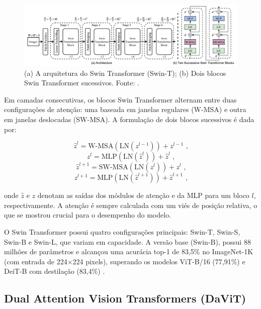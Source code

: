 \begin{figure}[!htbp]
    \centering
    \includegraphics[width=\linewidth]{figs/swin_t-arch.png}
    \caption{(a) A arquitetura do Swin Transformer (Swin-T); (b) Dois blocos Swin Transformer sucessivos. Fonte: .}
    \label{fig:swin-t-arch}
\end{figure}

Em camadas consecutivas, os blocos Swin Transformer alternam entre duas configurações de atenção: uma baseada em janelas regulares (W-MSA) e outra em janelas deslocadas (SW-MSA). A formulação de dois blocos sucessivos é dada por:

\begin{equation}
    \hat{z}^{l} = \text{W-MSA}(\text{LN}(z^{l-1}))+z^{l-1} \text{ ,}
\end{equation}
\begin{equation}
    z^{l} = \text{MLP}(\text{LN}(\hat{z}^{l}))+\hat{z}^{l} \text{ ,}
\end{equation}
\begin{equation}
    \hat{z}^{l+1} = \text{SW-MSA}(\text{LN}(z^{l}))+z^{l} \text{ ,}
\end{equation}
\begin{equation}
    z^{l+1} = \text{MLP}(\text{LN}(\hat{z}^{l+1}))+\hat{z}^{l+1} \text{ ,}
\end{equation}

onde $\hat{z}$ e $z$ denotam as saídas dos módulos de atenção e da MLP para um bloco $l$, respectivamente. A atenção é sempre calculada com um viés de posição relativa, o que se mostrou crucial para o desempenho do modelo.

O Swin Transformer possui quatro configurações principais: Swin-T, Swin-S, Swin-B e Swin-L, que variam em capacidade. A versão base (Swin-B), possui 88 milhões de parâmetros e alcançou uma acurácia top-1 de 83,5\% no ImageNet-1K (com entrada de 224×224 pixels), superando os modelos ViT-B/16 (77,91\%) e DeiT-B com destilação (83,4\%) \cite{Dosovitskiy2021, Touvron2021}.

\subsection{Dual Attention Vision Transformers (DaViT)}

